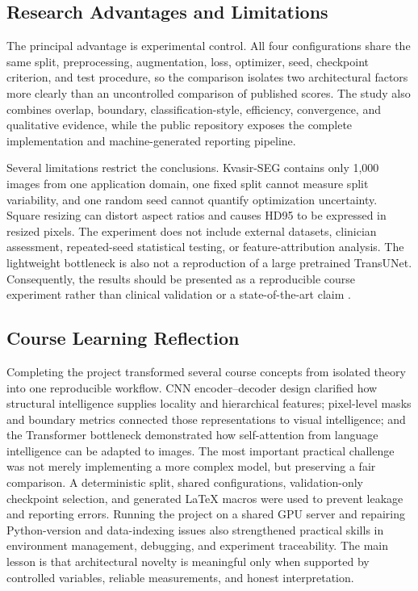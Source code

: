 \documentclass[a4paper,10pt]{article}
\begin{document}
\subsection{Research Advantages and Limitations}

The principal advantage is experimental control. All four configurations share the same split, preprocessing, augmentation, loss, optimizer, seed, checkpoint criterion, and test procedure, so the comparison isolates two architectural factors more clearly than an uncontrolled comparison of published scores. The study also combines overlap, boundary, classification-style, efficiency, convergence, and qualitative evidence, while the public repository exposes the complete implementation and machine-generated reporting pipeline.

Several limitations restrict the conclusions. Kvasir-SEG contains only 1,000 images from one application domain, one fixed split cannot measure split variability, and one random seed cannot quantify optimization uncertainty. Square resizing can distort aspect ratios and causes HD95 to be expressed in resized pixels. The experiment does not include external datasets, clinician assessment, repeated-seed statistical testing, or feature-attribution analysis. The lightweight bottleneck is also not a reproduction of a large pretrained TransUNet. Consequently, the results should be presented as a reproducible course experiment rather than clinical validation or a state-of-the-art claim \cite{maierhein2018rankings}.

\subsection{Course Learning Reflection}

Completing the project transformed several course concepts from isolated theory into one reproducible workflow. CNN encoder--decoder design clarified how structural intelligence supplies locality and hierarchical features; pixel-level masks and boundary metrics connected those representations to visual intelligence; and the Transformer bottleneck demonstrated how self-attention from language intelligence can be adapted to images. The most important practical challenge was not merely implementing a more complex model, but preserving a fair comparison. A deterministic split, shared configurations, validation-only checkpoint selection, and generated LaTeX macros were used to prevent leakage and reporting errors. Running the project on a shared GPU server and repairing Python-version and data-indexing issues also strengthened practical skills in environment management, debugging, and experiment traceability. The main lesson is that architectural novelty is meaningful only when supported by controlled variables, reliable measurements, and honest interpretation.
\end{document}
